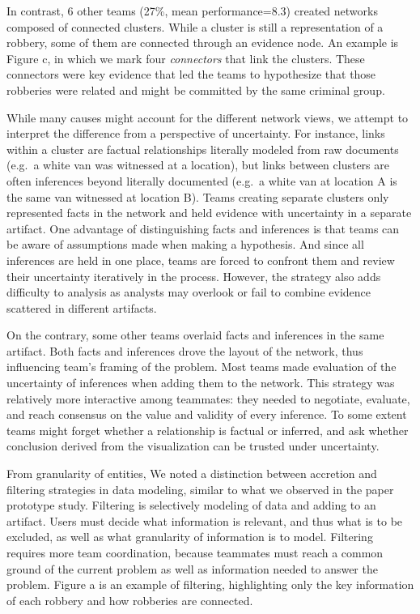 In contrast, 6 other teams (27\%, mean performance=8.3) created networks
composed of connected clusters. While a cluster is still a
representation of a robbery, some of them are connected through an
evidence node. An example is Figure \autocite{fig:network}c, in which we
mark four \emph{connectors} that link the clusters. These connectors
were key evidence that led the teams to hypothesize that those robberies
were related and might be committed by the same criminal group.

While many causes might account for the different network views, we
attempt to interpret the difference from a perspective of uncertainty.
For instance, links within a cluster are factual relationships literally
modeled from raw documents (e.g.~a white van was witnessed at a
location), but links between clusters are often inferences beyond
literally documented (e.g.~a white van at location A is the same van
witnessed at location B). Teams creating separate clusters only
represented facts in the network and held evidence with uncertainty in a
separate artifact. One advantage of distinguishing facts and inferences
is that teams can be aware of assumptions made when making a hypothesis.
And since all inferences are held in one place, teams are forced to
confront them and review their uncertainty iteratively in the process.
However, the strategy also adds difficulty to analysis as analysts may
overlook or fail to combine evidence scattered in different artifacts.

On the contrary, some other teams overlaid facts and inferences in the
same artifact. Both facts and inferences drove the layout of the
network, thus influencing team's framing of the problem. Most teams made
evaluation of the uncertainty of inferences when adding them to the
network. This strategy was relatively more interactive among teammates:
they needed to negotiate, evaluate, and reach consensus on the value and
validity of every inference. To some extent teams might forget whether a
relationship is factual or inferred, and ask whether conclusion derived
from the visualization can be trusted under uncertainty.

From granularity of entities, We noted a distinction between accretion
and filtering strategies in data modeling, similar to what we observed
in the paper prototype study. Filtering is selectively modeling of data
and adding to an artifact. Users must decide what information is
relevant, and thus what is to be excluded, as well as what granularity
of information is to model. Filtering requires more team coordination,
because teammates must reach a common ground of the current problem as
well as information needed to answer the problem. Figure
\autocite{fig:network}a is an example of filtering, highlighting only
the key information of each robbery and how robberies are connected.

